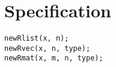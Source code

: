 \section{Specification}\label{specification}

\begin{lstlisting}[language=fanC]
newRlist(x, n);
newRvec(x, n, type);
newRmat(x, m, n, type);
\end{lstlisting}

